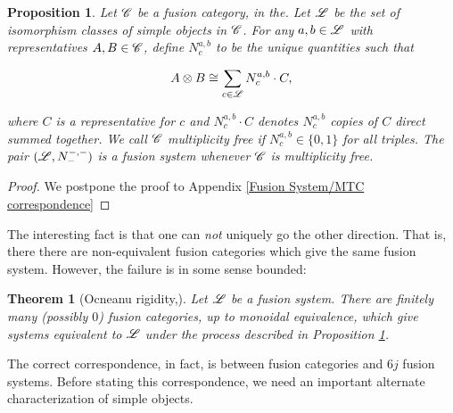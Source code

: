 \documentclass{article}
\newtheorem{theorem}{Theorem}[section]
\newtheorem{proposition}{Proposition}[section]
\theoremstyle{definition}
\numberwithin{figure}{section}
\begin{document}
\begin{proposition}\label{Make fusion system} Let $\mathscr{C}$ be a fusion category, in the. Let $\mathscr{L}$ be the set of isomorphism classes of simple objects in $\mathscr{C}$. For any $a,b\in \mathscr{L}$ with representatives $A,B\in\mathscr{C}$, define $N^{a,b}_c$ to be the unique quantities such that

$$A\otimes B\cong \sum_{c\in \mathscr{L}} N^{a,b}_c\cdot C,$$

where $C$ is a representative for $c$ and $N^{a,b}_c\cdot C$ denotes $N^{a,b}_c$ copies of $C$ direct summed together. We call $\mathscr{C}$ \textit{multiplicity free} if $N^{a,b}_{c}\in \{0,1\}$ for all triples. The pair $(\mathscr{L},N^{\--,\--}_{\--})$ is a fusion system whenever $\mathscr{C}$ is multiplicity free.
\end{proposition}
\begin{proof} We postpone the proof to Appendix \ref{Fusion System/MTC correspondence}
\end{proof}

The interesting fact is that one can \textit{not} uniquely go the other direction. That is, there there are non-equivalent fusion categories which give the same fusion system. However, the failure is in some sense bounded:

\begin{theorem}[Ocneanu rigidity,\cite{gainutdinov2023davydov}] Let $\mathscr{L}$ be a fusion system. There are finitely many (possibly $0$) fusion categories, up to monoidal equivalence, which give systems equivalent to $\mathscr{L}$ under the process described in Proposition \ref{Make fusion system}.
\end{theorem}

The correct correspondence, in fact, is between fusion categories and $6j$ fusion systems. Before stating this correspondence, we need an important alternate characterization of simple objects.
\end{document}
